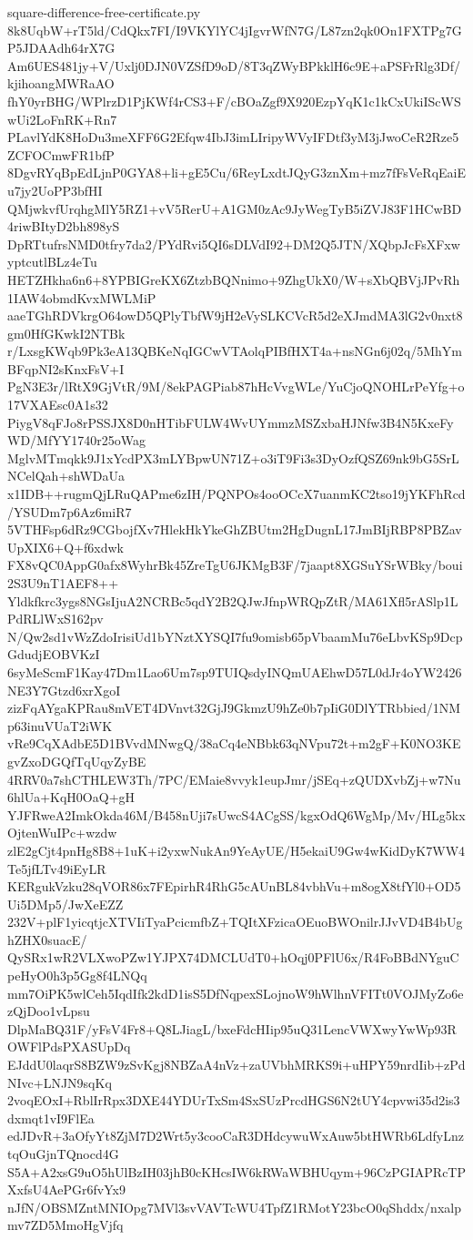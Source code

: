 \documentclass[11pt]{article}
\theoremstyle{definition}
\theoremstyle{remark}
\begin{document}
\begin{filecontents*}[overwrite]{square-difference-free-certificate.py}
8k8UqbW+rT5ld/CdQkx7FI/I9VKYlYC4jIgvrWfN7G/L87zn2qk0On1FXTPg7GP5JDAAdh64rX7G
Am6UES481jy+V/Uxlj0DJN0VZSfD9oD/8T3qZWyBPkklH6c9E+aPSFrRlg3Df/kjihoangMWRaAO
fhY0yrBHG/WPlrzD1PjKWf4rCS3+F/cBOaZgf9X920EzpYqK1c1kCxUkiIScWSwUi2LoFnRK+Rn7
PLavlYdK8HoDu3meXFF6G2Efqw4IbJ3imLIripyWVyIFDtf3yM3jJwoCeR2Rze5ZCFOCmwFR1bfP
8DgvRYqBpEdLjnP0GYA8+li+gE5Cu/6ReyLxdtJQyG3znXm+mz7fFsVeRqEaiEu7jy2UoPP3bfHI
QMjwkvfUrqhgMlY5RZ1+vV5RerU+A1GM0zAc9JyWegTyB5iZVJ83F1HCwBD4riwBItyD2bh898yS
DpRTtufrsNMD0tfry7da2/PYdRvi5QI6sDLVdI92+DM2Q5JTN/XQbpJcFsXFxwyptcutlBLz4eTu
HETZHkha6n6+8YPBIGreKX6ZtzbBQNnimo+9ZhgUkX0/W+sXbQBVjJPvRh1IAW4obmdKvxMWLMiP
aaeTGhRDVkrgO64owD5QPlyTbfW9jH2eVySLKCVcR5d2eXJmdMA3lG2v0nxt8gm0HfGKwkI2NTBk
r/LxsgKWqb9Pk3eA13QBKeNqIGCwVTAolqPIBfHXT4a+nsNGn6j02q/5MhYmBFqpNI2sKnxFsV+I
PgN3E3r/lRtX9GjVtR/9M/8ekPAGPiab87hHcVvgWLe/YuCjoQNOHLrPeYfg+o17VXAEsc0A1s32
PiygV8qFJo8rPSSJX8D0nHTibFULW4WvUYmmzMSZxbaHJNfw3B4N5KxeFyWD/MfYY1740r25oWag
MglvMTmqkk9J1xYcdPX3mLYBpwUN71Z+o3iT9Fi3s3DyOzfQSZ69nk9bG5SrLNCelQah+shWDaUa
x1IDB++rugmQjLRuQAPme6zIH/PQNPOs4ooOCcX7uanmKC2tso19jYKFhRcd/YSUDm7p6Az6miR7
5VTHFsp6dRz9CGbojfXv7HlekHkYkeGhZBUtm2HgDugnL17JmBIjRBP8PBZavUpXIX6+Q+f6xdwk
FX8vQC0AppG0afx8WyhrBk45ZreTgU6JKMgB3F/7jaapt8XGSuYSrWBky/boui2S3U9nT1AEF8++
Yldkfkrc3ygs8NGsIjuA2NCRBc5qdY2B2QJwJfnpWRQpZtR/MA61Xfl5rASlp1LPdRLlWxS162pv
N/Qw2sd1vWzZdoIrisiUd1bYNztXYSQI7fu9omisb65pVbaamMu76eLbvKSp9DcpGdudjEOBVKzI
6syMeScmF1Kay47Dm1Lao6Um7sp9TUIQsdyINQmUAEhwD57L0dJr4oYW2426NE3Y7Gtzd6xrXgoI
zizFqAYgaKPRau8mVET4DVnvt32GjJ9GkmzU9hZe0b7pIiG0DlYTRbbied/1NMp63inuVUaT2iWK
vRe9CqXAdbE5D1BVvdMNwgQ/38aCq4eNBbk63qNVpu72t+m2gF+K0NO3KEgvZxoDGQfTqUqyZyBE
4RRV0a7shCTHLEW3Th/7PC/EMaie8vvyk1eupJmr/jSEq+zQUDXvbZj+w7Nu6hlUa+KqH0OaQ+gH
YJFRweA2ImkOkda46M/B458nUji7sUwcS4ACgSS/kgxOdQ6WgMp/Mv/HLg5kxOjtenWuIPc+wzdw
zlE2gCjt4pnHg8B8+1uK+i2yxwNukAn9YeAyUE/H5ekaiU9Gw4wKidDyK7WW4Te5jfLTv49iEyLR
KERgukVzku28qVOR86x7FEpirhR4RhG5cAUnBL84vbhVu+m8ogX8tfYl0+OD5Ui5DMp5/JwXeEZZ
232V+plF1yicqtjcXTVIiTyaPcicmfbZ+TQItXFzicaOEuoBWOnilrJJvVD4B4bUghZHX0suacE/
QySRx1wR2VLXwoPZw1YJPX74DMCLUdT0+hOqj0PFlU6x/R4FoBBdNYguCpeHyO0h3p5Gg8f4LNQq
mm7OiPK5wlCeh5IqdIfk2kdD1isS5DfNqpexSLojnoW9hWlhnVFITt0VOJMyZo6ezQjDoo1vLpsu
DlpMaBQ31F/yFsV4Fr8+Q8LJiagL/bxeFdcHIip95uQ31LencVWXwyYwWp93ROWFlPdsPXASUpDq
EJddU0laqrS8BZW9zSvKgj8NBZaA4nVz+zaUVbhMRKS9i+uHPY59nrdIib+zPdNIvc+LNJN9sqKq
2voqEOxI+RblIrRpx3DXE44YDUrTxSm4SxSUzPrcdHGS6N2tUY4cpvwi35d2is3dxmqt1vI9FlEa
edJDvR+3aOfyYt8ZjM7D2Wrt5y3cooCaR3DHdcywuWxAuw5btHWRb6LdfyLnztqOuGjnTQnocd4G
S5A+A2xsG9uO5hUlBzIH03jhB0cKHcsIW6kRWaWBHUqym+96CzPGIAPRcTPXxfsU4AePGr6fvYx9
nJfN/OBSMZntMNIOpg7MVl3svVAVTcWU4TpfZ1RMotY23bcO0qShddx/nxalpmv7ZD5MmoHgVjfq

\end{filecontents*}
\end{document}
